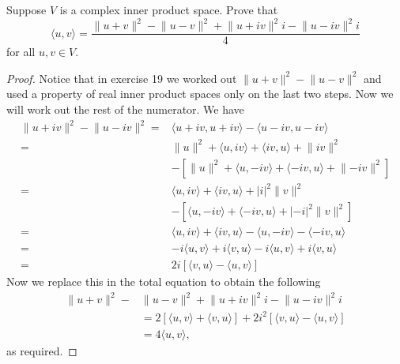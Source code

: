 \begin{exercise}{20}
  Suppose $V$ is a complex inner product space. Prove that
  \[
  \langle u,v\rangle =\frac{\lVert u+v\rVert^2-\lVert u-v\rVert^2+\lVert u+iv\rVert^2i-\lVert u-iv\rVert^2i}{4}
  \]
  for all $u,v\in V$.
\end{exercise}
\begin{proof}
 Notice that in exercise 19 we worked out $\lVert u+v\rVert^2-\lVert u-v\rVert^2$ and used a property of real inner product spaces only on the last two steps. Now we will work out the rest of the numerator. We have 
 \begin{align*}
     \lVert u+iv\rVert^2-\lVert u-iv\rVert^2 =& \langle u+iv, u+iv\rangle- \langle u-iv,u-iv\rangle\\
     =& \lVert u\rVert^2 +\langle u, iv\rangle +\langle iv,u\rangle +\lVert iv\rVert^2\\
     &-[\lVert u\rVert^2+\langle u,-iv\rangle+\langle -iv,u\rangle+\lVert -iv\rVert^2]\\
     =& \langle u, iv\rangle +\langle iv,u\rangle +\lvert i\rvert^2\lVert v\rVert^2\\
     &-[\langle u,-iv\rangle+\langle -iv,u\rangle+\lvert -i\rvert^2\lVert v\rVert^2]\\
     =& \langle u, iv\rangle +\langle iv,u\rangle -\langle u,-iv\rangle-\langle -iv,u\rangle\\
     =& -i\langle u,v\rangle +i\langle v, u\rangle -i\langle u,v\rangle +i\langle v,u\rangle\\
     =& 2i[\langle v,u\rangle-\langle u,v\rangle]
 \end{align*}
 Now we replace this in the total equation to obtain the following
 \begin{align*}
     \lVert u+v\rVert^2-&\lVert u-v\rVert^2+\lVert u+iv\rVert^2i-\lVert u-iv\rVert^2i\\ &= 2[\langle u,v\rangle +\langle v,u\rangle] + 2i^2[\langle v,u\rangle-\langle u,v\rangle]\\
     &= 4\langle u,v\rangle,
 \end{align*}
 as required.
\end{proof}

